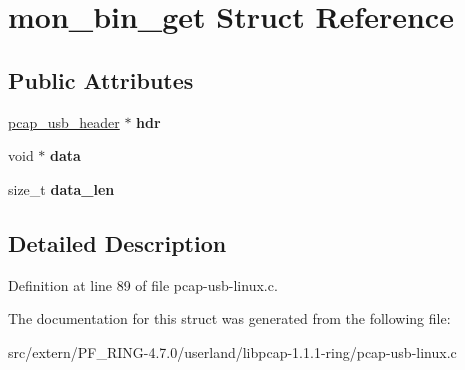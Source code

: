 \hypertarget{structmon__bin__get}{
\section{mon\_\-bin\_\-get Struct Reference}
\label{structmon__bin__get}
}
\subsection*{Public Attributes}
\begin{DoxyCompactItemize}
\item 
\hypertarget{structmon__bin__get_a681edfe621b6e0c4439f78a14853c854}{
\hyperlink{struct__usb__header}{pcap\_\-usb\_\-header} $\ast$ {\bfseries hdr}}
\label{structmon__bin__get_a681edfe621b6e0c4439f78a14853c854}

\item 
\hypertarget{structmon__bin__get_af87959e36f3f0a815a7a845a6b0cc20c}{
void $\ast$ {\bfseries data}}
\label{structmon__bin__get_af87959e36f3f0a815a7a845a6b0cc20c}

\item 
\hypertarget{structmon__bin__get_a01798ab15cdefa164a13e16064b3e6d2}{
size\_\-t {\bfseries data\_\-len}}
\label{structmon__bin__get_a01798ab15cdefa164a13e16064b3e6d2}

\end{DoxyCompactItemize}


\subsection{Detailed Description}


Definition at line 89 of file pcap-\/usb-\/linux.c.



The documentation for this struct was generated from the following file:\begin{DoxyCompactItemize}
\item 
src/extern/PF\_\-RING-\/4.7.0/userland/libpcap-\/1.1.1-\/ring/pcap-\/usb-\/linux.c\end{DoxyCompactItemize}
